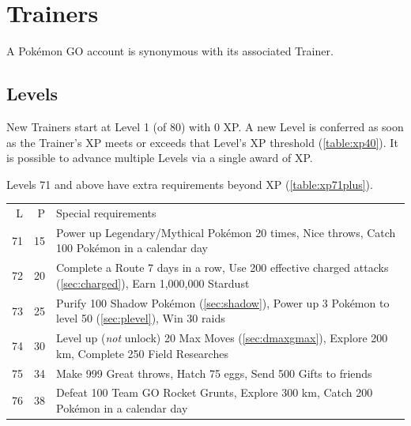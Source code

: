 \chapter{Trainers}
A Pokémon GO account is synonymous with its associated Trainer.

\section{Levels\label{sec:levels}}
New Trainers start at Level 1 (of 80) with 0 XP\@.
A new Level is conferred as soon as the Trainer's XP meets or exceeds
  that Level's XP threshold (\autoref{table:xp40}).
It is possible to advance multiple Levels via a single award of XP\@.

Levels 71 and above have extra requirements beyond XP (\autoref{table:xp71plus}).
\begin{table}
\centering\footnotesize
\begin{tabular}{rrp{}}
L & P & Special requirements \\
\rowcolor{Gray!25}
  71 & 15 & Power up Legendary/Mythical Pokémon 20 times,\newline
  999 Nice throws,\newline
  Catch 100 Pokémon in a calendar day\\
  72 & 20 & Complete a Route 7 days in a row,\newline
  Use 200 effective charged attacks (\autoref{sec:charged}),\newline
  Earn 1,000,000 Stardust\\
\rowcolor{Gray!25}
  73 & 25 & Purify 100 Shadow Pokémon (\autoref{sec:shadow}),\newline
  Power up 3 Pokémon to level 50 (\autoref{sec:plevel}),\newline
  Win 30 raids\\
  74 & 30 & Level up (\textit{not} unlock) 20 Max Moves (\autoref{sec:dmaxgmax}),\newline
  Explore 200 km,\newline
  Complete 250 Field Researches\\
\rowcolor{Gray!25}
  75 & 34 & Make 999 Great throws,\newline
  Hatch 75 eggs,\newline
  Send 500 Gifts to friends\\
  76 & 38 & Defeat 100 Team GO Rocket Grunts,\newline
  Explore 300 km,\newline
  Catch 200 Pokémon in a calendar day\\

\end{tabular}
\end{table}
